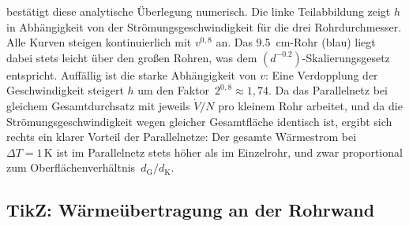 ﻿\documentclass[12pt,a4paper,twoside]{article}
\theoremstyle{plain}
\theoremstyle{definition}
\theoremstyle{remark}
\newcommand{\dG}{d_{\mathrm{G}}}
\newcommand{\dK}{d_{\mathrm{K}}}
\begin{document}
\noindent
{} bestätigt diese analytische Überlegung numerisch.
Die linke Teilabbildung zeigt $h$ in Abhängigkeit von der Strömungsgeschwindigkeit
für die drei Rohrdurchmesser.
Alle Kurven steigen kontinuierlich mit $v^{0{,}8}$ an.
Das \SI{9.5}{\centi\metre}-Rohr (blau) liegt dabei stets leicht über den großen
Rohren, was dem $(d^{-0.2})$-Skalierungsgesetz entspricht.
Auffällig ist die starke Abhängigkeit von $v$: Eine Verdopplung der
Geschwindigkeit steigert $h$ um den Faktor~$2^{0{,}8} \approx 1{,}74$.
Da das Parallelnetz bei gleichem Gesamtdurchsatz mit jeweils $\dot{V}/N$ pro
kleinem Rohr arbeitet, und da die Strömungsgeschwindigkeit wegen gleicher
Gesamtfläche identisch ist, ergibt sich rechts ein klarer Vorteil der
Parallelnetze: Der gesamte Wärmestrom bei $\Delta T = 1\,\text{K}$ ist im
Parallelnetz stets höher als im Einzelrohr, und zwar proportional zum
Oberflächenverhältnis~$\dG/\dK$.

\subsection{TikZ: Wärmeübertragung an der Rohrwand}
\label{ssec:tikz_waerme}
\end{document}

